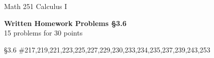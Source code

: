 \documentclass[11pt]{report}
\theoremstyle{plain}
\begin{document}
\hfill Math 251 Calculus I
\begin{center}
\Large{\textbf{Written Homework Problems \S 3.6}} \\
15 problems for 30 points\\
\end{center}

\begin{description}
\item{\S 3.6} \#217,219,221,223,225,227,229,230,233,234,235,237,239,243,253
\end{description}
\end{document}
